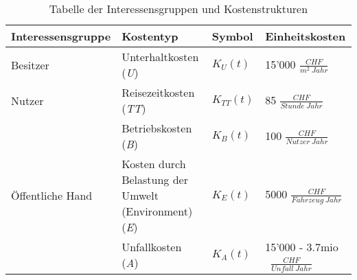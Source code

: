 %
%
%
%

\begin{table}[hbt!]
\flushleft
%
%
\begin{tabular}{@{}p{3.5cm} p{4cm} p{1.35cm} p{4.65cm}@{}} \\   
\toprule
\textbf{Interessensgruppe} & \textbf{Kostentyp} & \textbf{Symbol} & \textbf{Einheitskosten} \\
\midrule
Besitzer                   & Unterhaltkosten (\textit{U})                    & $K_{U}(t)$    & 15'000 $\frac{CHF}{m^2 \ Jahr}$              \\
Nutzer		               & Reisezeitkosten (\textit{TT})                   & $K_{TT}(t)$   & 85 $\frac{CHF}{Stunde \ Jahr}$               \\
                           & Betriebskosten (\textit{B})            		 & $K_{B}(t)$    & 100 $\frac{CHF}{Nutzer \ Jahr}$              \\
Öffentliche Hand           & Kosten durch Belastung \newline der Umwelt \newline (Environment) (\textit{E})   & $K_{E}(t)$    & 5000 $\frac{CHF}{Fahrzeug \ Jahr}$      \\
                           & Unfallkosten (\textit{A})                       & $K_{A}(t)$    & 15'000 - 3.7mio \ $\frac{CHF}{Unfall \ Jahr}$    \\
\bottomrule

\end{tabular}
\caption{Tabelle der Interessensgruppen und Kostenstrukturen}
\label{tab:t-04-01-Interessensgruppen}
\end{table}


%


